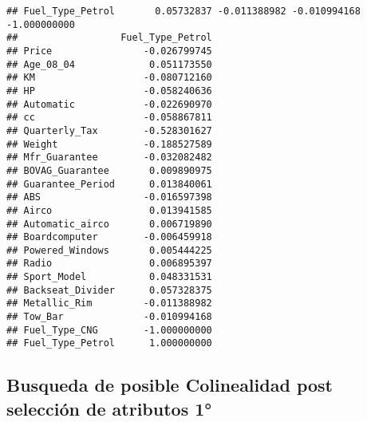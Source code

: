 \documentclass[]{article}
\newenvironment{Shaded}{\begin{snugshade}}{\end{snugshade}}
\newcommand{\DecValTok}[1]{\textcolor[rgb]{0.00,0.00,0.81}{#1}}
\newcommand{\KeywordTok}[1]{\textcolor[rgb]{0.13,0.29,0.53}{\textbf{#1}}}
\newcommand{\NormalTok}[1]{#1}
\newcommand{\OperatorTok}[1]{\textcolor[rgb]{0.81,0.36,0.00}{\textbf{#1}}}
\newcommand{\StringTok}[1]{\textcolor[rgb]{0.31,0.60,0.02}{#1}}
\begin{document}
\begin{verbatim}
## Fuel_Type_Petrol       0.05732837 -0.011388982 -0.010994168  -1.000000000
##                  Fuel_Type_Petrol
## Price                -0.026799745
## Age_08_04             0.051173550
## KM                   -0.080712160
## HP                   -0.058240636
## Automatic            -0.022690970
## cc                   -0.058867811
## Quarterly_Tax        -0.528301627
## Weight               -0.188527589
## Mfr_Guarantee        -0.032082482
## BOVAG_Guarantee       0.009890975
## Guarantee_Period      0.013840061
## ABS                  -0.016597398
## Airco                 0.013941585
## Automatic_airco       0.006719890
## Boardcomputer        -0.006459918
## Powered_Windows       0.005444225
## Radio                 0.006895397
## Sport_Model           0.048331531
## Backseat_Divider      0.057328375
## Metallic_Rim         -0.011388982
## Tow_Bar              -0.010994168
## Fuel_Type_CNG        -1.000000000
## Fuel_Type_Petrol      1.000000000
\end{verbatim}

\hypertarget{busqueda-de-posible-colinealidad-post-seleccion-de-atributos-1}{%
\subsection{Busqueda de posible Colinealidad post selección de atributos
1°}\label{busqueda-de-posible-colinealidad-post-seleccion-de-atributos-1}}

\begin{Shaded}
\end{Shaded}
\end{document}
